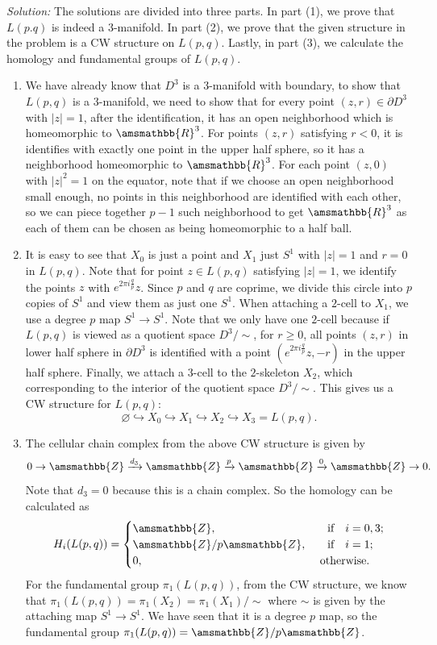 \documentclass[a4paper, 12pt]{article}
\newenvironment{solution}
    {\textit{Solution:}}
    {}
\renewcommand{\mathbb}{\amsmathbb}
\newcommand{\iif}{\ \ \ \text{if}\ \ \ }
\newcommand{\otherwise}{\text{otherwise}}
\begin{document}
\begin{solution}
The solutions are divided into three parts. In part (1), we prove that \(L(p.q)\) is indeed a \(3\)-manifold. In part (2), we prove that the given structure in the problem is a CW structure on \(L(p,q)\). Lastly, 
in part (3), we calculate the homology and fundamental groups of \(L(p,q)\).
\begin{enumerate}[(1)]
\item We have already know that \(D^3\) is a \(3\)-manifold with boundary, to show that \(L(p,q)\) is a \(3\)-manifold, we need to show that for every point \((z,r)\in \partial D^3\) with \(|z|=1\), after the identification, it has 
an open neighborhood which is homeomorphic to \(\mathbb{R}^3\). For points \((z,r)\) satisfying \(r< 0\), it is identifies with exactly one point in the upper half sphere, so it has  a neighborhood homeomorphic to \(\mathbb{R}^3\). For each 
point \((z,0)\) with \(|z|^2=1\) on the equator, note that if we choose an open neighborhood small enough, no points in this neighborhood are identified with each other, so we can piece together \(p-1\) such neighborhood to get \(\mathbb{R}^3\) as 
each of them can be chosen as being homeomorphic to a half ball.
\item It is easy to see that \(X_0\) is just a point and \(X_1\) just \(S^1\) with \(|z|=1\) and \(r=0\) in \(L(p,q)\). Note that for point \(z\in L(p,q)\) satisfying \(|z|=1\), we identify the points \(z\) with \(e^{2\pi i\frac{q}{p}}z\). Since \(p\) and \(q\) are 
coprime, we divide this circle into \(p\) copies of \(S^1\) and view them as just one \(S^1\). When attaching a \(2\)-cell to \(X_1\), we use a degree \(p\) map \(S^1\rightarrow S^1\). Note that we only have one \(2\)-cell because if \(L(p,q)\) is viewed as a quotient space \(D^3/\sim\), 
for \(r\geq 0\), all points \((z,r)\) in lower half sphere in \(\partial D^3\) is identified with a point \((e^{2\pi i \frac{q}{p}}z,-r)\) in the upper half sphere. Finally, we attach a \(3\)-cell to the \(2\)-skeleton \(X_2\), which corresponding to the interior of the quotient space \(D^3/\sim\). This gives us 
a CW structure for \(L(p,q)\):
\[\varnothing \hookrightarrow X_0\hookrightarrow X_1\hookrightarrow X_2\hookrightarrow X_3=L(p,q).\]
\item The cellular chain complex from the above CW structure is given by 
\[0\rightarrow \mathbb{Z}\xrightarrow{d_3}\mathbb{Z}\xrightarrow{p}\mathbb{Z}\xrightarrow{0}\mathbb{Z}\rightarrow 0.\]
Note that \(d_3=0\) because this is a chain complex. So the homology can be calculated as 
\[H_i(L(p,q))=\begin{cases}
    \mathbb{Z},&\iif i=0,3;\\ 
    \mathbb{Z}/ p \mathbb{Z},&\iif i=1;\\
    0,&\ \otherwise.
\end{cases}\]
For the fundamental group \(\pi_1(L(p,q))\), from the CW structure, we know that \(\pi_1(L(p,q))=\pi_1(X_2)=\pi_1(X_1)/\sim\) where \(\sim\) is given by the attaching map \(S^1\rightarrow S^1\). We have seen that it is a degree \(p\) map, so the fundamental group 
\(\pi_1(L(p,q))=\mathbb{Z}/p \mathbb{Z}\).
\end{enumerate}
\end{solution}
\end{document}
